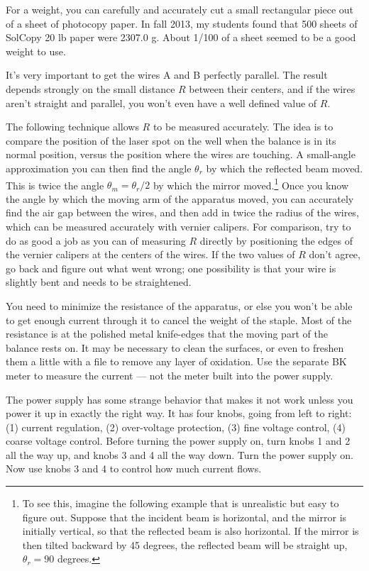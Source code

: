 For a weight, you can carefully and accurately cut a small rectangular piece
out of a sheet of photocopy paper. In fall 2013, my students found that 500
sheets of SolCopy 20 lb paper were 2307.0 g. About 1/100 of a sheet seemed to
be a good weight to use.

It's very important to get the wires A and B perfectly parallel. The result
depends strongly on the small distance $R$ between their centers, and if the
wires aren't straight and parallel, you won't even have a well defined value
of $R$. 

The following
technique allows $R$ to be measured accurately.
The idea is to compare the position
of the laser spot on the well when the balance is in its normal position, versus
the position where the wires are touching. A small-angle approximation you can then find
the angle $\theta_r$ by which the reflected beam moved. This is twice the angle
$\theta_m=\theta_r/2$ by which the mirror moved.\footnote{To see this, imagine the following
example that is unrealistic but easy to figure out. Suppose that
the incident beam is horizontal, and the mirror is initially vertical, so that the reflected
beam is also horizontal. If the mirror is then tilted backward by 45 degrees, the reflected
beam will be straight up, $\theta_r=90$ degrees.}
Once you know the angle by which the moving arm of the apparatus moved, you can accurately
find the air gap between the wires, and then add in twice the radius of the wires, which can
be measured accurately with vernier calipers. For comparison, try to do as good a job as
you can of measuring $R$ directly by positioning the edges of the vernier calipers at the
centers of the wires. If the two values of $R$ don't agree, go back and figure out what
went wrong; one possibility is that your wire is slightly bent and needs to be straightened.

You need to minimize the resistance of the apparatus, or else you won't be
able to get enough current through it to cancel the weight of the staple.
Most of the resistance is at the polished metal knife-edges that the
moving part of the balance rests on. It may be necessary to clean the
surfaces, or even to freshen them a little with a file to remove any layer
of oxidation. Use the separate BK meter to measure the current --- not the
meter built into the power supply.

The power supply has some strange behavior that makes it not work unless
you power it up in exactly the right way. It has four knobs, going from
left to right: (1) current regulation, (2) over-voltage protection, (3)
fine voltage control, (4) coarse voltage control. Before turning the power
supply on, turn knobs 1 and 2 all the way up, and knobs 3 and 4 all the way
down. Turn the power supply on. Now use knobs 3 and 4 to control how much
current flows.

